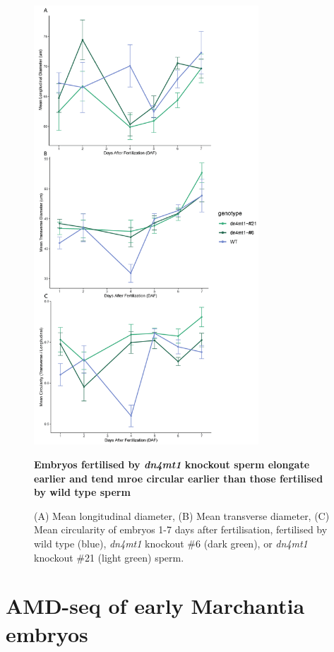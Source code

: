 \begin{figure}[htbp!] 
\centering    
    \includegraphics[width=0.75\textwidth]{Chapter3/Figs/Figure7_circularity.pdf}
\caption{\textbf{Embryos fertilised by \textit{dn4mt1} knockout sperm elongate earlier and tend mroe circular earlier than those fertilised by wild type sperm}}
\label{fig:circularity}
\captionsetup{font=small}
    \caption*{(A) Mean longitudinal diameter, (B) Mean transverse diameter, (C) Mean circularity of embryos 1-7 days after fertilisation, fertilised by wild type (blue), \textit{dn4mt1} knockout \#6 (dark green), or \textit{dn4mt1} knockout \#21 (light green) sperm.}
\end{figure}


\section{AMD-seq of early Marchantia embryos}

